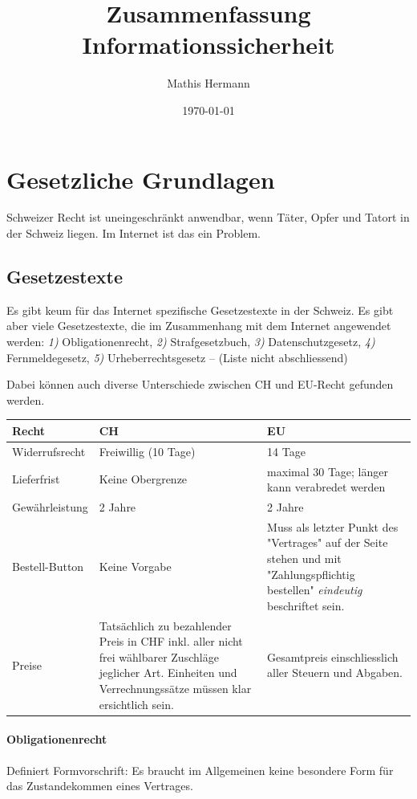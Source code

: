 \documentclass[a4paper,12pt]{article}
\begin{document}
\title{Zusammenfassung Informationssicherheit}
\author{Mathis Hermann}
\date{\today}
\maketitle

\section{Gesetzliche Grundlagen}
Schweizer Recht ist uneingeschränkt anwendbar, wenn Täter, Opfer und Tatort in der Schweiz liegen. Im Internet ist das ein Problem.

\subsection{Gesetzestexte}
Es gibt keum für das Internet spezifische Gesetzestexte in der Schweiz. Es gibt aber viele Gesetzestexte, die im Zusammenhang mit dem Internet angewendet werden: \emph{1)} Obligationenrecht, \emph{2)} Strafgesetzbuch,  \emph{3)} Datenschutzgesetz,  \emph{4)} Fernmeldegesetz,  \emph{5)} Urheberrechtsgesetz -- (Liste nicht abschliessend)

Dabei können auch diverse Unterschiede zwischen CH und EU-Recht gefunden werden.
\begin{center}
\begin{tabular}{ | m{2.5cm} | m{4.5cm} | m{4.5cm} | } 
Recht & CH & EU\\ 
\hline
Widerrufsrecht & Freiwillig (10 Tage) & 14 Tage\\
Lieferfrist & Keine Obergrenze & maximal 30 Tage; länger kann verabredet werden\\
Gewährleistung & 2 Jahre & 2 Jahre\\
Bestell-Button & Keine Vorgabe & Muss als letzter Punkt des "Vertrages" auf der Seite stehen und mit "Zahlungspflichtig bestellen" \emph{eindeutig} beschriftet sein.\\
Preise & Tatsächlich zu bezahlender Preis in CHF inkl. aller nicht frei wählbarer Zuschläge jeglicher Art. Einheiten und Verrechnungssätze müssen klar ersichtlich sein. & Gesamtpreis einschliesslich aller Steuern und Abgaben.\\
\end{tabular}
\end{center}




\paragraph{Obligationenrecht} Definiert Formvorschrift: Es braucht im Allgemeinen keine besondere Form für das Zustandekommen eines Vertrages.
\end{document}
